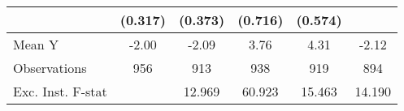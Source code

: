 {\begin{tabular}{l*{5}{c}}
            &     (0.317)         &     (0.373)         &     (0.716)         &     (0.574)         &                     \\
\midrule
Mean Y      &       -2.00         &       -2.09         &        3.76         &        4.31         &       -2.12         \\
Observations&         956         &         913         &         938         &         919         &         894         \\
Exc. Inst. F-stat&                     &      12.969         &      60.923         &      15.463         &      14.190         \\
\bottomrule
\end{tabular}
}
